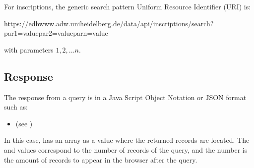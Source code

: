 \documentclass[a4paper,12pt,english]{sphinxhowto}
\begin{document}
For inscriptions, the generic search pattern Uniform Resource Identifier
(URI) is:

\begin{sphinxVerbatim}[commandchars=\\\{\},formatcom=\footnotesize]
https://edh\PYGZhy{}www.adw.uni\PYGZhy{}heidelberg.de/data/api/inscriptions/search?par\PYGZus{}1=value\PYGZam{}par\PYGZus{}2=value\PYGZam{}par\PYGZus{}n=value
\end{sphinxVerbatim}

with parameters  \(1,2,...n\).



\subsection{Response}
\label{\detokenize{Epigraphic:response}}
The response from a query is in a Java Script Object Notation or JSON format such as:

\begin{sphinxVerbatim}[commandchars=\\\{\},formatcom=\footnotesize]
     
     
     \PYG{p}{[}  \PYG{p}{]}
\end{sphinxVerbatim}
\begin{itemize}
\item {} 
(see {\hyperref[\detokenize{DDHH:json-str}]{}})

\end{itemize}

In this case,  has an array as a value where the returned records are located. The 
and  values correspond to the  number of records of the query, and the  number is
the amount of records to appear in the browser after the query.
\end{document}
